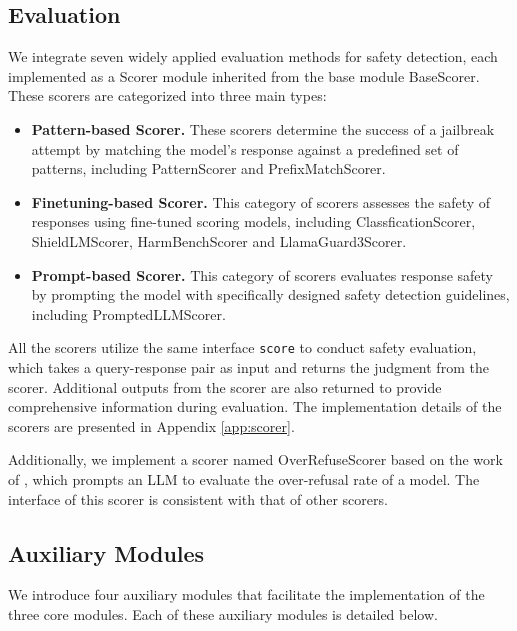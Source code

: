 \subsection{Evaluation}
\label{appsec:evaluation}


We integrate seven widely applied evaluation methods for safety detection, each implemented as a Scorer module inherited from the base module BaseScorer. These scorers are categorized into three main types:

\begin{itemize}
    \item \textbf{Pattern-based Scorer.} These scorers determine the success of a jailbreak attempt by matching the model’s response against a predefined set of patterns, including PatternScorer and PrefixMatchScorer.
    \item \textbf{Finetuning-based Scorer.} This category of scorers assesses the safety of responses using fine-tuned scoring models, including ClassficationScorer, ShieldLMScorer, HarmBenchScorer and LlamaGuard3Scorer.
    \item \textbf{Prompt-based Scorer.} This category of scorers evaluates response safety by prompting the model with specifically designed safety detection guidelines, including PromptedLLMScorer.
\end{itemize}

All the scorers utilize the same interface \texttt{score} to conduct safety evaluation, which takes a query-response pair as input and returns the judgment from the scorer. Additional outputs from the scorer are also returned to provide comprehensive information during evaluation. The implementation details of the scorers are presented in Appendix \ref{app:scorer}.

Additionally, we implement a scorer named OverRefuseScorer based on the work of \citet{rottger2024xstest}, which prompts an LLM to evaluate the over-refusal rate of a model. The interface of this scorer is consistent with that of other scorers.

\subsection{Auxiliary Modules}
We introduce four auxiliary modules that facilitate the implementation of the three core modules. Each of these auxiliary modules is detailed below.

